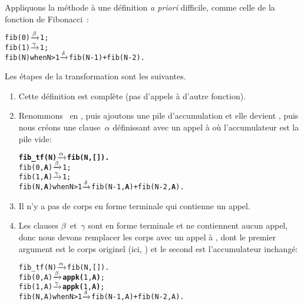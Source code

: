  Appliquons la méthode
à une définition \emph{a priori} difficile, comme celle de la fonction
de Fibonacci~:
\begin{alltt}
fib(0)            \(\smashedrightarrow{\beta}\) 1;
fib(1)            \(\smashedrightarrow{\gamma}\) 1;
fib(N) when N > 1 \(\smashedrightarrow{\delta}\) fib(N-1) + fib(N-2).
\end{alltt}
Les étapes de la transformation sont les suivantes.
\begin{enumerate}

  \item Cette définition est complète (pas d'appels à d'autre fonction).

  \item Renommons~ en , puis ajoutons
    une pile d'accumulation et elle devient , puis nous
    créons une clause~\(\alpha\) définissant  avec
    un appel à  où l'accumulateur est la pile vide:
\begin{alltt}
\textbf{fib_tf(N)           \(\smashedrightarrow{\alpha}\) fib(N,[]).}\hfill% \emph{Nouveau}
fib(0,\textbf{A})            \(\smashedrightarrow{\beta}\) 1;
fib(1,\textbf{A})            \(\smashedrightarrow{\gamma}\) 1;
fib(N,\textbf{A}) when N > 1 \(\smashedrightarrow{\delta}\) fib(N-1,\textbf{A}) + fib(N-2,\textbf{A}).
\end{alltt}

  \item Il n'y a pas de corps en forme terminale qui contienne un appel.

  \item Les clauses \(\beta\)~et~\(\gamma\) sont en forme terminale et
    ne contiennent aucun appel, donc nous devons remplacer les corps
    avec un appel à , dont le premier argument est le
    corps originel (ici, ) et le second est l'accumulateur
    inchangé:
\begin{alltt}
fib_tf(N)           \(\smashedrightarrow{\alpha}\) fib(N,[]).
fib(0,A)            \(\smashedrightarrow{\beta}\) \textbf{appk(}1,\textbf{A)};
fib(1,A)            \(\smashedrightarrow{\gamma}\) \textbf{appk(}1,\textbf{A)};
fib(N,A) when N > 1 \(\smashedrightarrow{\delta}\) fib(N-1,A) + fib(N-2,A).
\end{alltt}


\end{enumerate}
